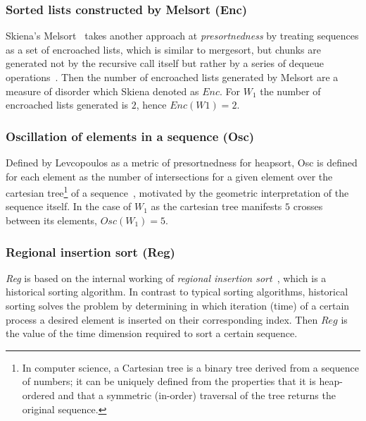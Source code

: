 \subsubsection{Sorted lists constructed by Melsort (Enc)}
Skiena's Melsort~\cite{Skiena_1988} takes another approach at \textit{presortnedness} by treating sequences as a set of encroached lists, which is similar to mergesort, but chunks are generated not by the recursive call itself but rather by a series of dequeue operations~\cite{Baeza-Yates_Manber_1992}. Then the number of encroached lists generated by Melsort are a measure of disorder which Skiena denoted as $Enc$. For $W_1$ the number of encroached lists generated is $2$, hence $Enc(W1)=2$.\\

\subsubsection{Oscillation of elements in a sequence (Osc)}
Defined by Levcopoulos as a metric of presortnedness for heapsort, Osc is defined for each element as the number of intersections for a given element over the cartesian tree\footnote{In computer science, a Cartesian tree is a binary tree derived from a sequence of numbers; it can be uniquely defined from the properties that it is heap-ordered and that a symmetric (in-order) traversal of the tree returns the original sequence.} of a sequence~\cite{Levcopoulos_Petersson_1993}, motivated by the geometric interpretation of the sequence itself. In the case of $W_1$ as the cartesian tree manifests $5$ crosses between its  elements, $Osc(W_1) = 5$.\\

\subsubsection{Regional insertion sort (Reg)}
\emph{Reg} is based on the internal working of \textit{regional insertion sort}~\cite{PETERSSON1995153}, which is a historical sorting algorithm. In contrast to typical sorting algorithms, historical sorting solves the problem by determining in which iteration (time) of a certain process a desired element is inserted on their corresponding index. Then $Reg$ is the value of the time dimension required to sort a certain sequence. 